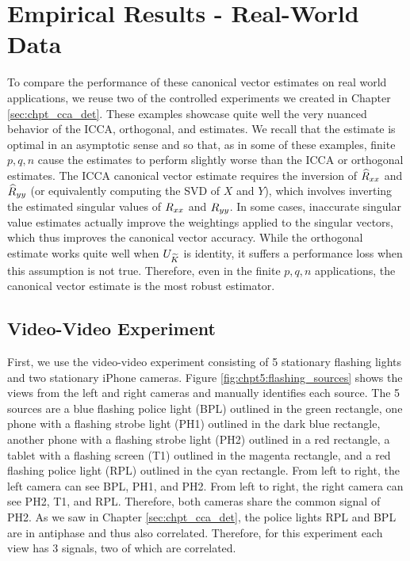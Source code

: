 \section{Empirical Results - Real-World Data}

To compare the performance of these canonical vector estimates on real world applications,
we reuse two of the controlled experiments we created in Chapter
\ref{sec:chpt_cca_det}. These examples showcase quite well the very nuanced behavior of
the ICCA, orthogonal, and \iccap estimates. We recall that the \iccap estimate is
optimal in an asymptotic sense and so that, as in some of these examples, finite $p,q,n$
cause the \iccap estimates to perform slightly worse than the ICCA or orthogonal
estimates. The ICCA canonical vector estimate requires the inversion of $\widehat{R}_{xx}$ and
$\widehat{R}_{yy}$ (or equivalently computing the SVD of $X$ and $Y$), which involves inverting the
estimated singular values of $R_{xx}$ and $R_{yy}$. In some cases, inaccurate singular value
estimates actually improve the weightings applied to the singular vectors, which thus
improves the canonical vector accuracy. While the orthogonal estimate works quite well
when $U_{\widetilde{K}}$ is identity, it suffers a performance loss when this assumption is not
true. Therefore, even in the finite $p,q,n$ applications, the \iccap canonical vector
estimate is the most robust estimator. 

\subsection{Video-Video Experiment}

First, we use the video-video experiment consisting of 5 stationary flashing lights and
two stationary iPhone cameras. Figure \ref{fig:chpt5:flashing_sources} shows the views
from the left and right cameras and manually identifies each source. The 5 sources are a
blue flashing police light (BPL) outlined in the green rectangle, one phone with a
flashing strobe light (PH1) outlined in the dark blue rectangle, another phone with a
flashing strobe light (PH2) outlined in a red rectangle, a tablet with a flashing screen
(T1) outlined in the magenta rectangle, and a red flashing police light (RPL) outlined in
the cyan rectangle. From left to right, the left camera can see BPL, PH1, and PH2. From
left to right, the right camera can see PH2, T1, and RPL. Therefore, both cameras share
the common signal of PH2. As we saw in Chapter \ref{sec:chpt_cca_det}, the police lights
RPL and BPL are in antiphase and thus also correlated. Therefore, for this experiment each
view has 3 signals, two of which are correlated. 

